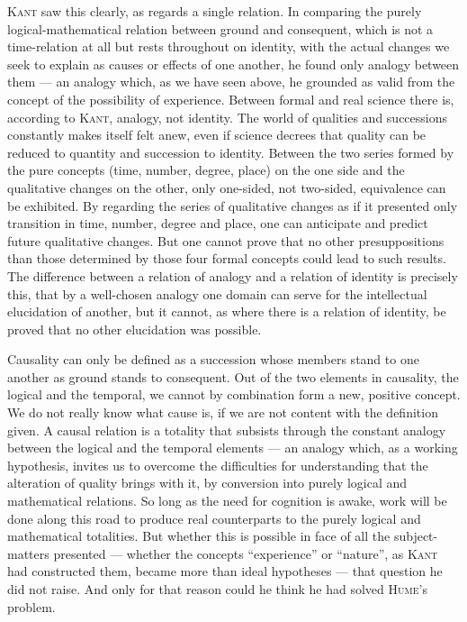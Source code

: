 \documentclass[12pt]{book}
\newcommand{\opage}[1]{\marginnote{\footnotesize\textit{[#1]}}}
\begin{document}
\textsc{Kant} saw this clearly, as regards a single relation. In comparing the
purely logical-mathematical relation between ground and consequent, which is not a
time-relation at all but rests throughout on identity, with the actual changes we
seek to explain as causes or effects of one another, he found only analogy between
them --- an analogy which, as we have seen above, he grounded as valid from the
concept of the possibility of experience. Between formal and real science there
is, according to \textsc{Kant}, analogy, not identity. The world of qualities and
successions constantly makes itself felt anew, even if science decrees that quality
can be reduced to quantity and succession to identity. Between the two series
formed by the pure concepts (time, number, degree, place) on the one side and the
qualitative changes on the other, only one-sided, not two-sided, equivalence can be
exhibited. By regarding the series of qualitative changes as if it presented only
transition in time, number, degree and place, one can anticipate and predict future
qualitative changes. But one cannot prove that no other presuppositions than those
determined by those four formal concepts could lead to such results. The difference
between a relation of analogy and a relation of identity is precisely this, that by
a well-chosen analogy one domain can serve for the intellectual elucidation of
another, but it cannot, as where there is a relation of identity, be proved that no
other elucidation was possible.

\opage{45}Causality can only be defined as a succession whose members stand to one another
as ground stands to consequent. Out of the two elements in causality, the logical
and the temporal, we cannot by combination form a new, positive concept. We do not
really know what cause is, if we are not content with the definition given. A
causal relation is a totality that subsists through the constant analogy between
the logical and the temporal elements --- an analogy which, as a working
hypothesis, invites us to overcome the difficulties for understanding that the
alteration of quality brings with it, by conversion into purely logical and
mathematical relations. So long as the need for cognition is awake, work will be
done along this road to produce real counterparts to the purely logical and
mathematical totalities. But whether this is possible in face of all the
subject-matters presented --- whether the concepts ``experience'' or ``nature'', as
\textsc{Kant} had constructed them, became more than ideal hypotheses --- that
question he did not raise. And only for that reason could he think he had solved
\textsc{Hume}'s problem.
\end{document}
